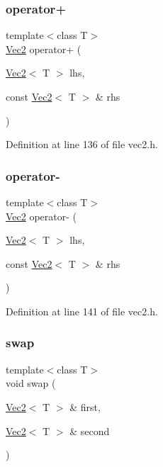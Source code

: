\subsubsection{\texorpdfstring{operator+}{operator+}}
{\footnotesize\ttfamily template$<$class T$>$ \\
\mbox{\hyperlink{class_vec2}{Vec2}} operator+ (\begin{DoxyParamCaption}\item[{\mbox{\hyperlink{class_vec2}{Vec2}}$<$ T $>$}]{lhs,  }\item[{const \mbox{\hyperlink{class_vec2}{Vec2}}$<$ T $>$ \&}]{rhs }\end{DoxyParamCaption})\hspace{0.3cm}{\ttfamily [friend]}}



Definition at line 136 of file vec2.\+h.

\mbox{\label{class_vec2_a44113a615ad1789757d4ac6abca8cb16}} 
\subsubsection{\texorpdfstring{operator-\/}{operator-}}
{\footnotesize\ttfamily template$<$class T$>$ \\
\mbox{\hyperlink{class_vec2}{Vec2}} operator-\/ (\begin{DoxyParamCaption}\item[{\mbox{\hyperlink{class_vec2}{Vec2}}$<$ T $>$}]{lhs,  }\item[{const \mbox{\hyperlink{class_vec2}{Vec2}}$<$ T $>$ \&}]{rhs }\end{DoxyParamCaption})\hspace{0.3cm}{\ttfamily [friend]}}



Definition at line 141 of file vec2.\+h.

\mbox{\label{class_vec2_a2d034101022deefa40f69318c0c9af22}} 
\subsubsection{\texorpdfstring{swap}{swap}}
{\footnotesize\ttfamily template$<$class T$>$ \\
void swap (\begin{DoxyParamCaption}\item[{\mbox{\hyperlink{class_vec2}{Vec2}}$<$ T $>$ \&}]{first,  }\item[{\mbox{\hyperlink{class_vec2}{Vec2}}$<$ T $>$ \&}]{second }\end{DoxyParamCaption})\hspace{0.3cm}{\ttfamily [friend]}}



